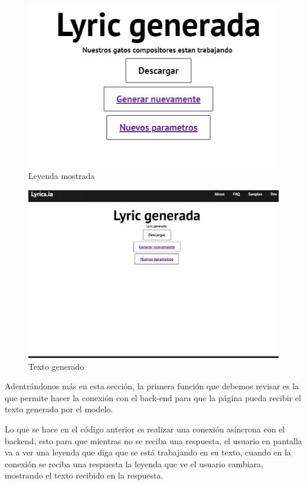 \documentclass[12pt, a4paper, titlepage]{report}
\begin{document}
\begin{figure}[H]
	\includegraphics[width=13.5cm]{./imagenes/Desarrollo/AplicacionWeb/Pleyenda.png}
	\centering 
	\caption{Leyenda mostrada}
\end{figure}
\begin{figure}[H]
	\includegraphics[width=13.5cm]{./imagenes/Desarrollo/AplicacionWeb/Ptexto.png}
	\centering 
	\caption{Texto generado}
\end{figure}
Adentrándonos más en esta sección, la primera función que debemos revisar es la que permite hacer la conexión con el back-end para que la página pueda recibir el texto generado por el modelo.
\begin{center}
	
\end{center}
Lo que se hace en el código anterior es realizar una conexión asíncrona con el backend, esto para que mientras no se reciba una respuesta, el usuario en pantalla va a ver una leyenda que diga que se está trabajando en su texto, cuando en la conexión se reciba una respuesta la leyenda que ve el usuario cambiara, mostrando el texto recibido en la respuesta.
\end{document}
